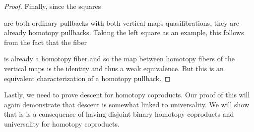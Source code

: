 \begin{prop}
\begin{proof}
        Finally, since the squares 
        \begin{center}
        \end{center}
        are both ordinary pullbacks %
        with both vertical maps quasifibrations, they are already homotopy pullbacks. %
        Taking the left square as an example, this follows from the fact that the fiber
        \begin{center}
        \end{center}
        is already a homotopy fiber and so the map between homotopy fibers of the vertical maps is the identity and thus a weak equivalence.
        But this is an equivalent characterization of a homotopy pullback. %
    \end{proof}
\end{prop}
Lastly, we need to prove descent for homotopy coproducts. 
Our proof of this will again demonstrate that descent is somewhat linked to universality.
We will show that is is a consequence of having disjoint binary homotopy coproducts and universality for homotopy coproducts.

